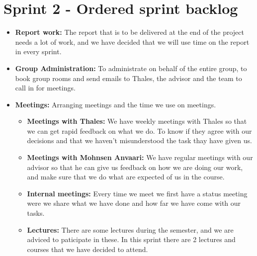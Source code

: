 \section{Sprint 2 - Ordered sprint backlog}

\begin{itemize}
\item{}\textbf{Report work:} The report that is to be delivered at the end of the project needs a lot of work, and we have decided that we will use time on the report in every sprint.
\item{}\textbf{Group Administration:} To administrate on behalf of the entire group, to book group rooms and send emails to Thales, the advisor and the team to call in for meetings.
\item{}\textbf{Meetings:} Arranging meetings and the time we use on meetings.
\begin{itemize}
\item{}\textbf{Meetings with Thales:} We have weekly meetings with Thales so that we can get rapid feedback on what we do. To know if they agree with our decisions and that we haven't misunderstood the task thay have given us.
\item{}\textbf{Meetings with Mohnsen Anvaari:} We have regular meetings with our advisor so that he can give us feedback on how we are doing our work, and make sure that we do what are expected of us in the course.
\item{}\textbf{Internal meetings:} Every time we meet we first have a status meeting were we share what we have done and how far we have come with our tasks.
\item{}\textbf{Lectures:} There are some lectures during the semester, and we are adviced to paticipate in these. In this sprint there are 2 lectures and courses that we have decided to attend.
\end{itemize}

\newpage


\end{itemize}
